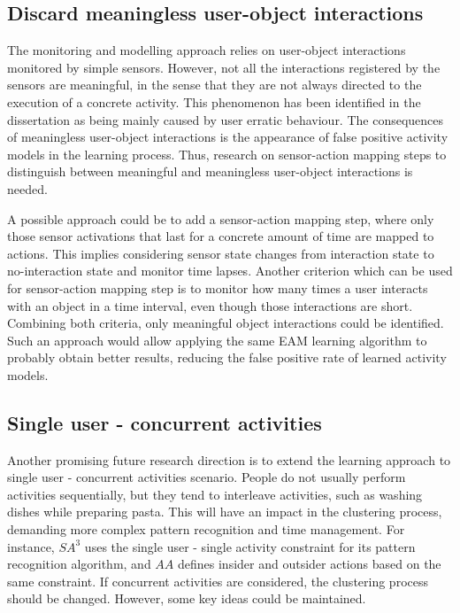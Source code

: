 \subsection{Discard meaningless user-object interactions}

The monitoring and modelling approach relies on user-object interactions monitored by simple sensors. However, not all the interactions registered by the sensors are meaningful, in the sense that they are not always directed to the execution of a concrete activity. This phenomenon has been identified in the dissertation as being mainly caused by user erratic behaviour. The consequences of meaningless user-object interactions is the appearance of false positive activity models in the learning process. Thus, research on sensor-action mapping steps to distinguish between meaningful and meaningless user-object interactions is needed.

A possible approach could be to add a sensor-action mapping step, where only those sensor activations that last for a concrete amount of time are mapped to actions. This implies considering sensor state changes from interaction state to no-interaction state and monitor time lapses. Another criterion which can be used for sensor-action mapping step is to monitor how many times a user interacts with an object in a time interval, even though those interactions are short. Combining both criteria, only meaningful object interactions could be identified. Such an approach would allow applying the same EAM learning algorithm to probably obtain better results, reducing the false positive rate of learned activity models.

\subsection{Single user - concurrent activities}

Another promising future research direction is to extend the learning approach to single user - concurrent activities scenario. People do not usually perform activities sequentially, but they tend to interleave activities, such as washing dishes while preparing pasta. This will have an impact in the clustering process, demanding more complex pattern recognition and time management. For instance, $SA^3$ uses the single user - single activity constraint for its pattern recognition algorithm, and $AA$ defines insider and outsider actions based on the same constraint. If concurrent activities are considered, the clustering process should be changed. However, some key ideas could be maintained. 

